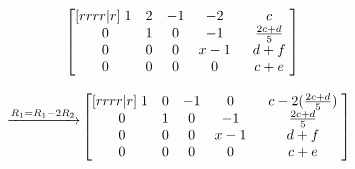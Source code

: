 \documentclass[a4paper]{article}
\begin{document}
\begin{enumerate}[label=\textbf{\arabic*.}]
\begin{enumerate}
$$\begin{matrix}
					~\\
				\end{matrix}
				\begin{bmatrix}[rrrr|r]
					\hspace{1mm} 1 & 2 & -1 & -2 \hspace{1mm} & \hspace{1mm} c \hspace{1mm}\\
					\hspace{1mm} 0 & 1 & 0 & -1 \hspace{1mm} & \hspace{1mm} \frac{2c + d}{5} \hspace{1mm}\\
					\hspace{1mm} 0 & 0 & 0 & x - 1 \hspace{1mm} & \hspace{1mm} d + f \hspace{1mm}\\
					\hspace{1mm} 0 & 0 & 0 & 0 \hspace{1mm} & \hspace{1mm} c + e \hspace{1mm}\\
				\end{bmatrix}
				$$

				$$
				\begin{matrix}
					~\\
					\xrightarrow{R_1 = R_1 - 2R_2} \\
					~\\
					~\\
				\end{matrix}
				\begin{bmatrix}[rrrr|r]
					\hspace{1mm} 1 & 0 & -1 & 0 \hspace{1mm} & \hspace{1mm} c - 2(\frac{2c + d}{5}) \hspace{1mm}\\
					\hspace{1mm} 0 & 1 & 0 & -1 \hspace{1mm} & \hspace{1mm} \frac{2c + d}{5} \hspace{1mm}\\
					\hspace{1mm} 0 & 0 & 0 & x - 1 \hspace{1mm} & \hspace{1mm} d + f \hspace{1mm}\\
					\hspace{1mm} 0 & 0 & 0 & 0 \hspace{1mm} & \hspace{1mm} c + e \hspace{1mm}\\
				\end{bmatrix}
				$$


\end{enumerate}
\end{enumerate}
\end{document}
